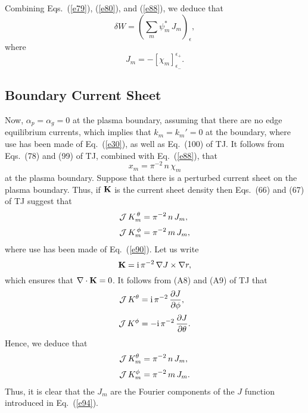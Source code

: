 \documentclass[12pt,prb,aps,notitlepage]{revtex4-1}
\begin{document}
Combining Eqs.~(\ref{e79}), (\ref{e80}), and (\ref{e88}), we deduce that
\begin{equation}\label{e89a}
\delta W = \left(\sum_m\psi_m^\ast\,J_m\right)_\epsilon,
\end{equation}
where
\begin{equation}\label{e90}
J_m= -\left[\chi_m\right]_{\epsilon_-}^{\epsilon_+}.
\end{equation}

\subsection{Boundary Current Sheet}
Now, $\alpha_p=\alpha_g=0$ at the plasma boundary, assuming that there are no edge equilibrium currents,
which implies that $k_m=k_m'=0$ at the boundary, where use has been made of Eq.~(\ref{e30}),
as well as Eq.~(100) of TJ.  It follows from Eqs.~(78) and (99) of TJ, combined with Eq.~(\ref{e88}),  that 
\begin{equation}\label{e91}
x_m= \pi^{-2}\,n\,\chi_m
\end{equation}
at the plasma boundary. Suppose that there is a perturbed current sheet on the plasma boundary. 
Thus, if ${\bf K}$ is the current sheet density then Eqs.~(66) and (67) of TJ suggest that
\begin{align}
{\cal J}\,K_m^{\,\theta} &=  \pi^{-2}\,n\,J_m,\\[0.5ex]
{\cal J}\,K_m^{\,\phi} &=\pi^{-2}\,m\,J_m,
\end{align}
where use has been made of Eq.~(\ref{e90}).
Let us write
\begin{equation}\label{e94}
{\bf K} = {\rm i}\,\pi^{-2}\,\nabla J\times \nabla r,
\end{equation}
which ensures that $\nabla\cdot{\bf K}=0$. It follows from (A8) and (A9) of TJ that
\begin{align}
{\cal J}\,K^\theta&= {\rm i}\,\pi^{-2}\,\frac{\partial J}{\partial \phi},\\[0.5ex]
{\cal J}\,K^\phi &=-{\rm i}\,\pi^{-2}\,\frac{\partial J}{\partial\theta}.
\end{align}
Hence, we deduce that 
\begin{align}
{\cal J}\,K^\theta_m&= \pi^{-2}\,n\,J_m,\\[0.5ex]
{\cal J}\,K^\phi_m &=\pi^{-2}\,m\,J_m.
\end{align}
Thus, it is clear that the $J_m$ are the Fourier components of the $J$ function introduced in Eq.~(\ref{e94}). 
\end{document}
